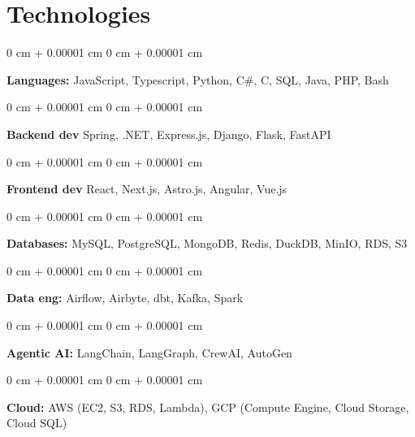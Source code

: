 \documentclass[10pt, letterpaper]{article}
\newenvironment{onecolentry}{
  \begin{adjustwidth}{
      0 cm + 0.00001 cm
    }{
      0 cm + 0.00001 cm
    }
  }{
  \end{adjustwidth}
} %
\begin{document}
  \section{Technologies}




  \begin{onecolentry}
    \textbf{Languages:} JavaScript, Typescript, Python, C\#, C, SQL, Java, PHP, Bash
  \end{onecolentry}

  \vspace{0.2 cm}

  \begin{onecolentry}
    \textbf{Backend dev} Spring, .NET, Express.js, Django, Flask, FastAPI
  \end{onecolentry}

  \vspace{0.2 cm}


  \begin{onecolentry}
    \textbf{Frontend dev} React, Next.js, Astro.js, Angular, Vue.js
  \end{onecolentry}


  \vspace{0.2 cm}

  \begin{onecolentry}
    \textbf{Databases:} MySQL, PostgreSQL, MongoDB, Redis, DuckDB, MinIO, RDS, S3
  \end{onecolentry}

  \vspace{0.2 cm}

  \begin{onecolentry}
    \textbf{Data eng: }  Airflow, Airbyte, dbt, Kafka, Spark
  \end{onecolentry}

  \vspace{0.2 cm}

  \begin{onecolentry}
    \textbf{Agentic AI:} LangChain, LangGraph, CrewAI, AutoGen
  \end{onecolentry}

  \vspace{0.2 cm}


  \begin{onecolentry}
    \textbf{Cloud:} AWS (EC2, S3, RDS, Lambda), GCP (Compute Engine, Cloud Storage, Cloud SQL)
  \end{onecolentry}

  \vspace{0.2 cm}
\end{document}
